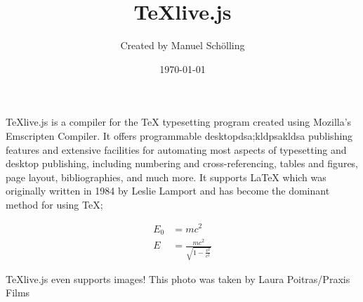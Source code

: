 \documentclass[12pt]{article}
\title{\TeX live.js}
\author{Created by Manuel Sch\"olling}
\date{\today}
\begin{document}
  \maketitle
  \TeX{}live.js is a compiler for the \TeX{}
  typesetting program created using Mozilla's Emscripten
  Compiler. It offers programmable desktopdsa;kldpsakldsa
  publishing features and extensive facilities for
  automating most aspects of typesetting and desktop
  publishing, including numbering and cross-referencing,
  tables and figures, page layout, bibliographies, and
  much more. It supports \LaTeX{} which was originally written 
  in 1984 by Leslie Lamport and has become the dominant method for
  using \TeX;
 
  \begin{align}
    E_0 &= mc^2                              \\
    E &= \frac{mc^2}{\sqrt{1-\frac{v^2}{c^2}}}
  \end{align}


  \TeX{}live.js even supports images! This photo was taken by Laura Poitras/Praxis Films
\end{document}
